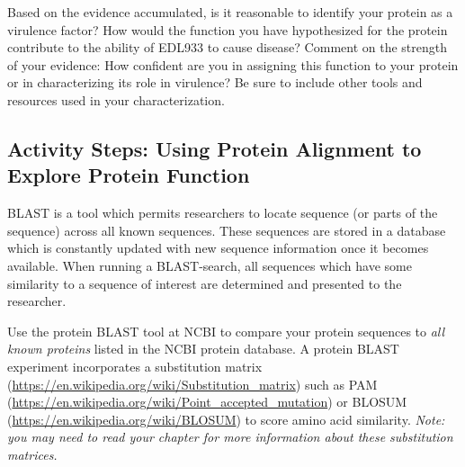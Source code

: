 Based on the evidence accumulated, is it reasonable to identify your protein as a virulence factor?  How would the function you have hypothesized for the protein contribute to the ability of EDL933 to cause disease?  Comment on the strength of your evidence:  How confident are you in assigning this function to your protein or in characterizing its role in virulence?  Be sure to include other tools and resources used in your characterization.



\vspace*{-.1in}
\subsection*{Activity Steps: Using Protein Alignment to Explore Protein Function}
\vspace*{-.1in} 
BLAST is a tool which permits researchers to locate sequence (or parts of the sequence) across all known sequences. These sequences are stored in a database which is constantly updated with new sequence information once it becomes available. When running a BLAST-search, all sequences which have some similarity to a sequence of interest are determined and presented to the researcher.

Use the protein BLAST tool at NCBI to compare your protein sequences to \emph{all known proteins} listed in the NCBI protein database. A protein BLAST experiment incorporates a substitution matrix (\url{https://en.wikipedia.org/wiki/Substitution_matrix}) such as PAM (\url{https://en.wikipedia.org/wiki/Point_accepted_mutation}) or BLOSUM (\url{https://en.wikipedia.org/wiki/BLOSUM}) to score amino acid similarity. \emph{Note: you may need to read your chapter for more information about these substitution matrices.}

